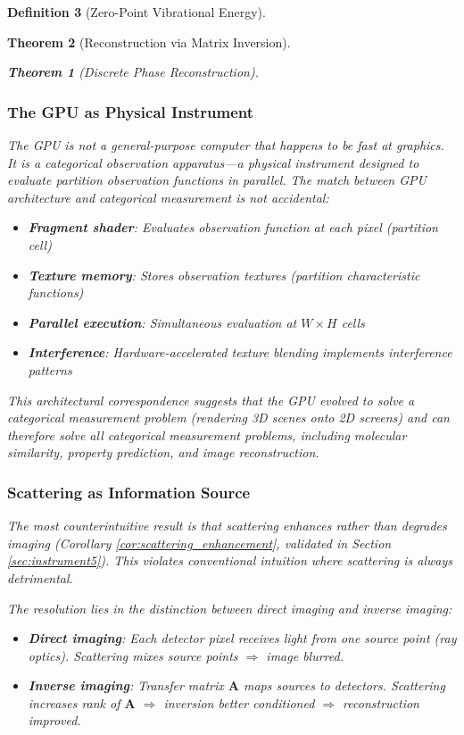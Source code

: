 \documentclass[11pt,a4paper]{article}
\newtheorem{theorem}{Theorem}[section]
\theoremstyle{definition}
\newtheorem{definition}[theorem]{Definition}
\theoremstyle{remark}
\begin{document}
\begin{definition}[Zero-Point Vibrational Energy]
\begin{theorem}[Reconstruction via Matrix Inversion]
\begin{theorem}[Discrete Phase Reconstruction]
\subsubsection{The GPU as Physical Instrument}

The GPU is not a general-purpose computer that happens to be fast at graphics. It is a \textit{categorical observation apparatus}—a physical instrument designed to evaluate partition observation functions in parallel. The match between GPU architecture and categorical measurement is not accidental:

\begin{itemize}
\item \textbf{Fragment shader}: Evaluates observation function at each pixel (partition cell)
\item \textbf{Texture memory}: Stores observation textures (partition characteristic functions)
\item \textbf{Parallel execution}: Simultaneous evaluation at $W \times H$ cells
\item \textbf{Interference}: Hardware-accelerated texture blending implements interference patterns
\end{itemize}

This architectural correspondence suggests that the GPU evolved to solve a categorical measurement problem (rendering 3D scenes onto 2D screens) and can therefore solve \textit{all} categorical measurement problems, including molecular similarity, property prediction, and image reconstruction.

\subsubsection{Scattering as Information Source}

The most counterintuitive result is that scattering \textit{enhances} rather than degrades imaging (Corollary \ref{cor:scattering_enhancement}, validated in Section \ref{sec:instrument5}). This violates conventional intuition where scattering is always detrimental.

The resolution lies in the distinction between \textit{direct imaging} and \textit{inverse imaging}:
\begin{itemize}
\item \textbf{Direct imaging}: Each detector pixel receives light from one source point (ray optics). Scattering mixes source points $\Rightarrow$ image blurred.
\item \textbf{Inverse imaging}: Transfer matrix $\mathbf{A}$ maps sources to detectors. Scattering increases rank of $\mathbf{A}$ $\Rightarrow$ inversion better conditioned $\Rightarrow$ reconstruction improved.
\end{itemize}


\end{theorem}
\end{theorem}
\end{definition}
\end{document}
